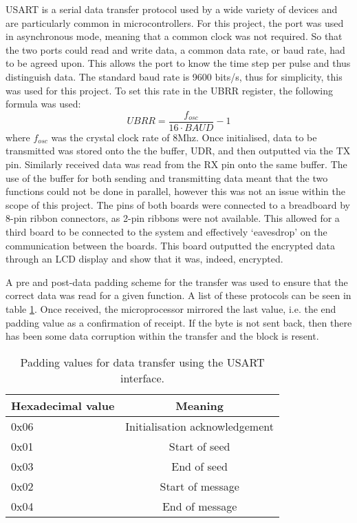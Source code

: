 \documentclass[a4paper,11pt,twocolumn]{article}
\begin{document}
	USART is a serial data transfer protocol used by a wide variety of devices and are particularly common in microcontrollers. For this project, the port was used in asynchronous mode, meaning that a common clock was not required. So that the two ports could read and write data, a common data rate, or baud rate\cite{bellmanual}, had to be agreed upon. This allows the port to know the time step per pulse and thus distinguish data. The standard baud rate is 9600 bits/s, thus for simplicity, this was used for this project. To set this rate in the UBRR register, the following formula\cite{atmega1282006datasheet} was used:
	\begin{equation}
		UBRR = \frac{f_{osc}}{16\cdot BAUD} - 1
	\end{equation}
	where $f_{osc}$ was the crystal clock rate of 8Mhz. Once initialised, data to be transmitted was stored onto the the buffer, UDR, and then outputted via the TX pin. Similarly received data was read from the RX pin onto the same buffer. The use of the buffer for both sending and transmitting data meant that the two functions could not be done in parallel, however this was not an issue within the scope of this project. The pins of both boards were connected to a breadboard by 8-pin ribbon connectors, as 2-pin ribbons were not available. This allowed for a third board to be connected to the system and effectively `eavesdrop' on the communication between the boards. This board outputted the encrypted data through an LCD display and show that it was, indeed, encrypted.
	
	A pre and post-data padding scheme for the transfer was used to ensure that the correct data was read for a given function. A list of these protocols can be seen in table \ref{table:protocols}. Once received, the microprocessor mirrored the last value, i.e. the end padding value as a confirmation of receipt. If the byte is not sent back, then there has been some data corruption within the transfer and the block is resent.
	
	\begin{table}
		\begin{center}
			\begin{tabular}[h]{|m{2.2cm} |c|}
				\hline
				Hexadecimal value & Meaning \\
				\hline
				0x06 & Initialisation acknowledgement\\
				\hline
				0x01 & Start of seed\\
				\hline
				0x03 & End of seed\\
				\hline
				0x02 & Start of message\\
				\hline
				0x04 & End of message\\
				\hline
			\end{tabular}
		\end{center}
		\caption{Padding values for data transfer using the USART interface.}
		\label{table:protocols}
	\end{table}
	 
\end{document}
